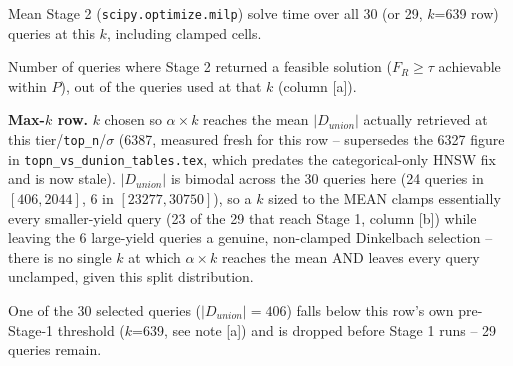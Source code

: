 \begin{table}[t]
\begin{threeparttable}
\begin{tablenotes}
\item[c] Mean Stage 2 (\texttt{scipy.optimize.milp}) solve time over all 30 (or 29, $k$=639 row)
  queries at this $k$, including clamped cells.
\item[d] Number of queries where Stage 2 returned a feasible solution ($F_R \geq \tau$ achievable
  within $P$), out of the queries used at that $k$ (column [a]).
\item[f] \textbf{Max-$k$ row.} $k$ chosen so $\alpha{\times}k$ reaches the mean $|D_{union}|$
  actually retrieved at this tier/\texttt{top\_n}/$\sigma$ (6387, measured fresh for this row --
  supersedes the 6327 figure in \texttt{topn\_vs\_dunion\_tables.tex}, which predates the
  categorical-only HNSW fix and is now stale). $|D_{union}|$ is bimodal across the 30 queries here
  (24 queries in $[406,2044]$, 6 in $[23277,30750]$), so a $k$ sized to the MEAN clamps essentially
  every smaller-yield query (23 of the 29 that reach Stage 1, column [b]) while leaving the 6
  large-yield queries a genuine, non-clamped Dinkelbach selection -- there is no single $k$ at which
  $\alpha{\times}k$ reaches the mean AND leaves every query unclamped, given this split
  distribution.
\item[g] One of the 30 selected queries ($|D_{union}|=406$) falls below this row's own pre-Stage-1
  threshold ($k$=639, see note [a]) and is dropped before Stage 1 runs -- 29 queries remain.
\end{tablenotes}
\end{threeparttable}
\end{table}
